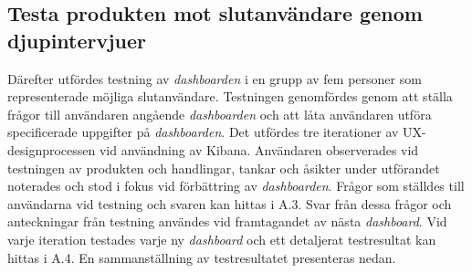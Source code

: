 \documentclass[12pt]{kththesis}
\begin{document}
\subsection{ Testa produkten mot slutanvändare genom djupintervjuer 
}
Därefter utfördes testning av \textit{dashboarden} i en grupp av fem personer som representerade möjliga slutanvändare. Testningen genomfördes genom att ställa frågor till användaren angående \textit{dashboarden} och att låta användaren utföra specificerade uppgifter på \textit{dashboarden}. Det utfördes tre iterationer av UX-designprocessen vid användning av Kibana. Användaren observerades vid testningen av produkten och handlingar, tankar och åsikter under utförandet noterades och stod i fokus vid förbättring av \textit{dashboarden}. Frågor som ställdes till användarna vid testning och svaren kan hittas i A.3. Svar från dessa frågor och anteckningar från testning användes vid framtagandet av nästa \textit{dashboard}. Vid varje iteration testades varje ny \textit{dashboard} och ett detaljerat testresultat kan hittas i A.4. En sammanställning av testresultatet presenteras nedan. 
\end{document}

